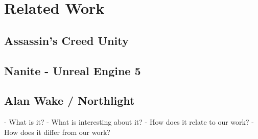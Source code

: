 \chapter{Related Work} \label{cpt-related-work}

\section{Assassin's Creed Unity}

\section{Nanite - Unreal Engine 5}

\section{Alan Wake / Northlight}





- What is it?
- What is interesting about it?
- How does it relate to our work?
- How does it differ from our work?
